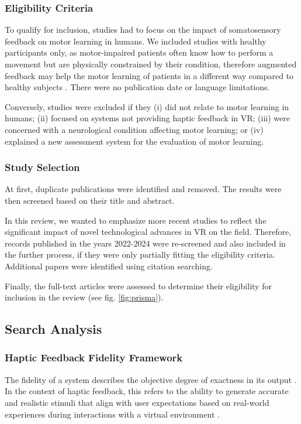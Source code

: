 \subsubsection{Eligibility Criteria}
\label{sec:eligibility}
To qualify for inclusion, studies had to focus on the impact of somatosensory feedback on motor learning in humans. We included studies with healthy participants only, as motor-impaired patients often know how to perform a movement but are physically constrained by their condition, therefore augmented feedback may help the motor learning of patients in a different way compared to healthy subjects \cite{Sigrist2013AugmentedReview}. There were no publication date or language limitations.

Conversely, studies were excluded if they (i) did not relate to motor learning in humans; (ii) focused on systems not providing haptic feedback in VR; (iii) were concerned with a neurological condition affecting motor learning; or (iv) explained a new assessment system for the evaluation of motor learning.

\subsubsection{Study Selection}
At first, duplicate publications were identified and removed. The results were then screened based on their title and abstract. 

In this review, we wanted to emphasize more recent studies to reflect the significant impact of novel technological advances in VR on the field. Therefore, records published in the years 2022-2024 were re-screened and also included in the further process, if they were only partially fitting the eligibility criteria. Additional papers were identified using citation searching.

Finally, the full-text articles were assessed to determine their eligibility for inclusion in the review (see fig. \ref{fig:prisma}).


\subsection{Search Analysis}
\subsubsection{Haptic Feedback Fidelity Framework}


The fidelity of a system describes the objective degree of exactness in its output \cite{McMahan2011ExploringGames}. 
In the context of haptic feedback, this refers to the ability to generate accurate and realistic stimuli that align with user expectations based on real-world experiences during interactions with a virtual environment \cite{Muender2022HapticReality}. 

